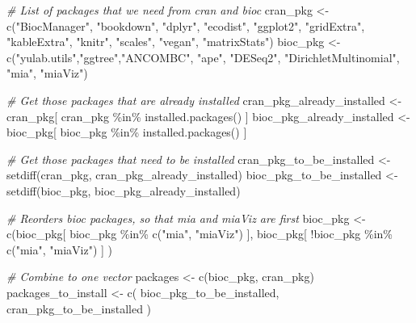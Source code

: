 \documentclass[
]{book}
\newenvironment{Shaded}{\begin{snugshade}}{\end{snugshade}}
\newcommand{\CommentTok}[1]{\textcolor[rgb]{0.56,0.35,0.01}{\textit{#1}}}
\newcommand{\FunctionTok}[1]{\textcolor[rgb]{0.00,0.00,0.00}{#1}}
\newcommand{\NormalTok}[1]{#1}
\newcommand{\OtherTok}[1]{\textcolor[rgb]{0.56,0.35,0.01}{#1}}
\newcommand{\SpecialCharTok}[1]{\textcolor[rgb]{0.00,0.00,0.00}{#1}}
\newcommand{\StringTok}[1]{\textcolor[rgb]{0.31,0.60,0.02}{#1}}
\begin{document}
\begin{Shaded}
\begin{Highlighting}[]
\CommentTok{\# List of packages that we need from cran and bioc }
\NormalTok{cran\_pkg }\OtherTok{\textless{}{-}} \FunctionTok{c}\NormalTok{(}\StringTok{"BiocManager"}\NormalTok{, }\StringTok{"bookdown"}\NormalTok{, }\StringTok{"dplyr"}\NormalTok{, }\StringTok{"ecodist"}\NormalTok{, }\StringTok{"ggplot2"}\NormalTok{, }
              \StringTok{"gridExtra"}\NormalTok{, }\StringTok{"kableExtra"}\NormalTok{,  }\StringTok{"knitr"}\NormalTok{, }\StringTok{"scales"}\NormalTok{, }\StringTok{"vegan"}\NormalTok{, }\StringTok{"matrixStats"}\NormalTok{)}
\NormalTok{bioc\_pkg }\OtherTok{\textless{}{-}} \FunctionTok{c}\NormalTok{(}\StringTok{"yulab.utils"}\NormalTok{,}\StringTok{"ggtree"}\NormalTok{,}\StringTok{"ANCOMBC"}\NormalTok{, }\StringTok{"ape"}\NormalTok{, }\StringTok{"DESeq2"}\NormalTok{, }\StringTok{"DirichletMultinomial"}\NormalTok{, }\StringTok{"mia"}\NormalTok{, }\StringTok{"miaViz"}\NormalTok{)}

\CommentTok{\# Get those packages that are already installed}
\NormalTok{cran\_pkg\_already\_installed }\OtherTok{\textless{}{-}}\NormalTok{ cran\_pkg[ cran\_pkg }\SpecialCharTok{\%in\%} \FunctionTok{installed.packages}\NormalTok{() ]}
\NormalTok{bioc\_pkg\_already\_installed }\OtherTok{\textless{}{-}}\NormalTok{ bioc\_pkg[ bioc\_pkg }\SpecialCharTok{\%in\%} \FunctionTok{installed.packages}\NormalTok{() ]}

\CommentTok{\# Get those packages that need to be installed}
\NormalTok{cran\_pkg\_to\_be\_installed }\OtherTok{\textless{}{-}} \FunctionTok{setdiff}\NormalTok{(cran\_pkg, cran\_pkg\_already\_installed)}
\NormalTok{bioc\_pkg\_to\_be\_installed }\OtherTok{\textless{}{-}} \FunctionTok{setdiff}\NormalTok{(bioc\_pkg, bioc\_pkg\_already\_installed)}

\CommentTok{\# Reorders bioc packages, so that mia and miaViz are first}
\NormalTok{bioc\_pkg }\OtherTok{\textless{}{-}} \FunctionTok{c}\NormalTok{(bioc\_pkg[ bioc\_pkg }\SpecialCharTok{\%in\%} \FunctionTok{c}\NormalTok{(}\StringTok{"mia"}\NormalTok{, }\StringTok{"miaViz"}\NormalTok{) ], }
\NormalTok{              bioc\_pkg[ }\SpecialCharTok{!}\NormalTok{bioc\_pkg }\SpecialCharTok{\%in\%} \FunctionTok{c}\NormalTok{(}\StringTok{"mia"}\NormalTok{, }\StringTok{"miaViz"}\NormalTok{) ] ) }

\CommentTok{\# Combine to one vector}
\NormalTok{packages }\OtherTok{\textless{}{-}} \FunctionTok{c}\NormalTok{(bioc\_pkg, cran\_pkg)}
\NormalTok{packages\_to\_install }\OtherTok{\textless{}{-}} \FunctionTok{c}\NormalTok{( bioc\_pkg\_to\_be\_installed, cran\_pkg\_to\_be\_installed )}
\end{Highlighting}
\end{Shaded}
\end{document}

